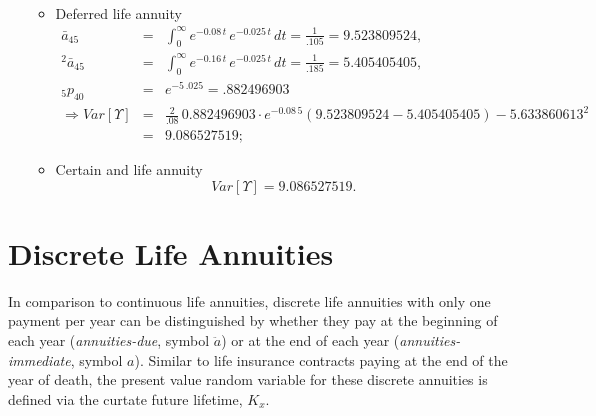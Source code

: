 \documentclass[11pt,fleqn,oneside]{book}
\begin{document}
\begin{enumerate}
\begin{itemize}
\begin{eqnarray*}
\end{eqnarray*}
\item Deferred life annuity
\begin{eqnarray*}
{\bar{a}_{45}} &=& \int_0^{\infty} e^{-0.08\,t}\,e^{-0.025\,t}\,dt = \frac{1}{.105} = 9.523809524,\\
{^2\bar{a}_{45}} &=& \int_0^{\infty} e^{-0.16\,t}\,e^{-0.025\,t}\,dt = \frac{1}{.185} = 5.405405405,\\
{_5p_{40}} &=& e^{-5\,.025} = .882496903\\
\Rightarrow Var[\Upsilon] &=& \frac{2}{.08}\,0.882496903\cdot e^{-0.08\,5} \left(9.523809524 - 5.405405405\right) - 5.633860613^2\\
&=& 9.086527519;
\end{eqnarray*}
\item Certain and life annuity
$$
Var[\Upsilon] = 9.086527519.
$$
\end{itemize}
\end{enumerate}

\normalsize

\section{Discrete Life Annuities}
\label{SECDISCANN}

In comparison to continuous life annuities, discrete life annuities with only one payment per year can be distinguished by whether they pay at the beginning of each year (\textit{annuities-due}, symbol $\ddot{a}$) or at the end of each year (\textit{annuities-immediate}, symbol $a$). Similar to life insurance contracts paying at the end of the year of death, the present value random variable for these discrete annuities is defined via the curtate future lifetime, $K_x$. 
\end{document}
